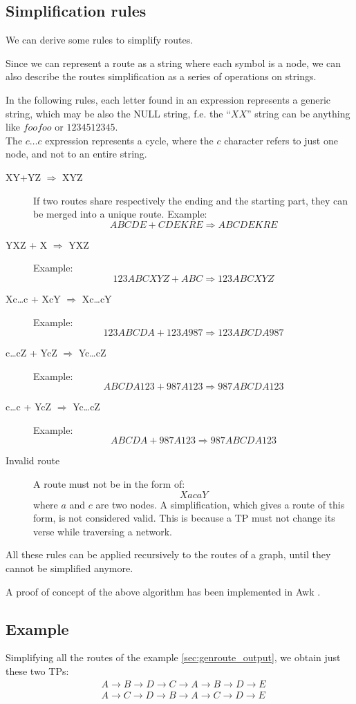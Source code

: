 \documentclass[a4paper]{article}
\begin{document}
\subsection{Simplification rules}
\label{sec:simplification_rules}

We can derive some rules to simplify routes.

Since we can represent a route as a string where each symbol is a node, we can
also describe the routes simplification as a series of operations on strings.

In the following rules, each letter found in an expression represents a generic string,
which may be also the NULL string, f.e. the ``$XX$'' string can be anything like
$foofoo$ or $1234512345$.
\\
The $c\dots c$ expression represents a cycle, where the $c$ character refers
to just one node, and not to an entire string.
\begin{description}
	\item[XY+YZ $\Rightarrow$ XYZ]
		If two routes share respectively the ending and the starting
		part, they can be merged into a unique route. Example:
		\[ABCDE + CDEKRE \Rightarrow ABCDEKRE \]
	\item[YXZ + X $\Rightarrow$ YXZ]
		Example:
		\[123ABCXYZ + ABC \Rightarrow 123ABCXYZ\]
	\item[Xc\dots c + XcY $\Rightarrow$ Xc\dots cY]
		Example:
		\[123ABCDA + 123A987 \Rightarrow 123ABCDA987\]
	\item[c\dots cZ + YcZ $\Rightarrow$ Yc\dots cZ]
		Example:
		\[ABCDA123 + 987A123 \Rightarrow 987ABCDA123\]
	\item[c\dots c + YcZ $\Rightarrow$ Yc\dots cZ]
		Example:
		\[ABCDA + 987A123 \Rightarrow 987ABCDA123\]
	\item[Invalid route]
		\label{sec:simroute_invalid}
		A route must not be in the form of:
		\[ XacaY \]
		where $a$ and $c$ are two nodes.
		A simplification, which gives a route of this form, is
		not considered valid. This is because a TP must not change its
		verse while traversing a network.
\end{description}

All these rules can be applied recursively to the routes of a graph, until
they cannot be simplified anymore.

A proof of concept of the above algorithm has been implemented in Awk \cite{simrouteawk}.

\subsection*{Example}
Simplifying all the routes of the example \ref{sec:genroute_output}, we obtain
just these two TPs:
\begin{align}
 &A \rightarrow B \rightarrow D \rightarrow C \rightarrow A \rightarrow B
 \rightarrow D \rightarrow E\\
 &A \rightarrow C \rightarrow D \rightarrow B \rightarrow A \rightarrow C \rightarrow D \rightarrow E
\end{align}
\end{document}
